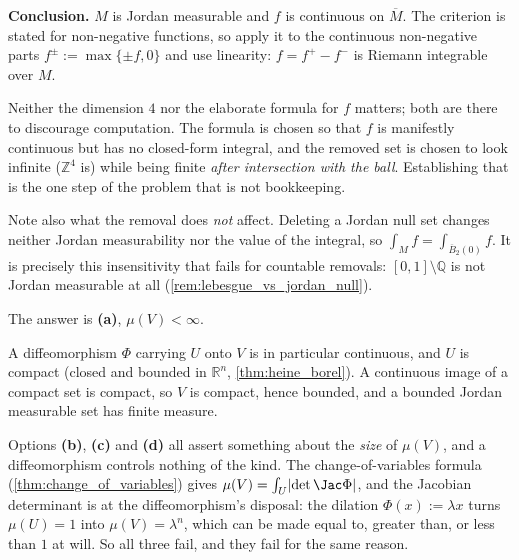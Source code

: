 \begin{exercisesolution}
\textbf{Conclusion.} $M$ is Jordan measurable and $f$ is continuous on $\overline M$. The criterion
is stated for non-negative functions, so apply it to the continuous non-negative parts
$f^\pm := \max\{\pm f, 0\}$ and use linearity: $f = f^+ - f^-$ is Riemann integrable over $M$.
\begin{remark}
Neither the dimension $4$ nor the elaborate formula for $f$ matters; both are there to discourage
computation. The formula is chosen so that $f$ is manifestly continuous but has no closed-form
integral, and the removed set is chosen to look infinite ($\mathbb{Z}^4$ is) while being
finite \emph{after intersection with the ball}. Establishing that is the one step of the problem
that is not bookkeeping.

Note also what the removal does \emph{not} affect. Deleting a Jordan null set changes neither
Jordan measurability nor the value of the integral, so
$\int_M f = \int_{\overline{B}_2(0)} f$. It is precisely this insensitivity that fails for
countable removals: $[0,1]\setminus\mathbb{Q}$ is not Jordan measurable at all
(\cref{rem:lebesgue_vs_jordan_null}).
\end{remark}
\end{exercisesolution}

\begin{exercisesolution}
\label{sol:kobel_diffeomorphic_jordan_measure}
The answer is \textbf{(a)}, $\mu(V) < \infty$.

A diffeomorphism $\Phi$ carrying $U$ onto $V$ is in particular continuous, and $U$ is compact
(closed and bounded in $\mathbb{R}^n$, \cref{thm:heine_borel}). A continuous image of a compact set
is compact, so $V$ is compact, hence bounded, and a bounded Jordan measurable set has finite
measure.

Options \textbf{(b)}, \textbf{(c)} and \textbf{(d)} all assert something about the \emph{size} of
$\mu(V)$, and a diffeomorphism controls nothing of the kind. The change-of-variables formula
(\cref{thm:change_of_variables}) gives
$\mu(V) = \int_U \lvert\det \Jac\Phi\rvert$, and the Jacobian determinant is at the diffeomorphism's
disposal: the dilation $\Phi(x) := \lambda x$ turns $\mu(U)=1$ into $\mu(V) = \lambda^n$, which can
be made equal to, greater than, or less than $1$ at will. So all three fail, and they fail for the
same reason.
\end{exercisesolution}

